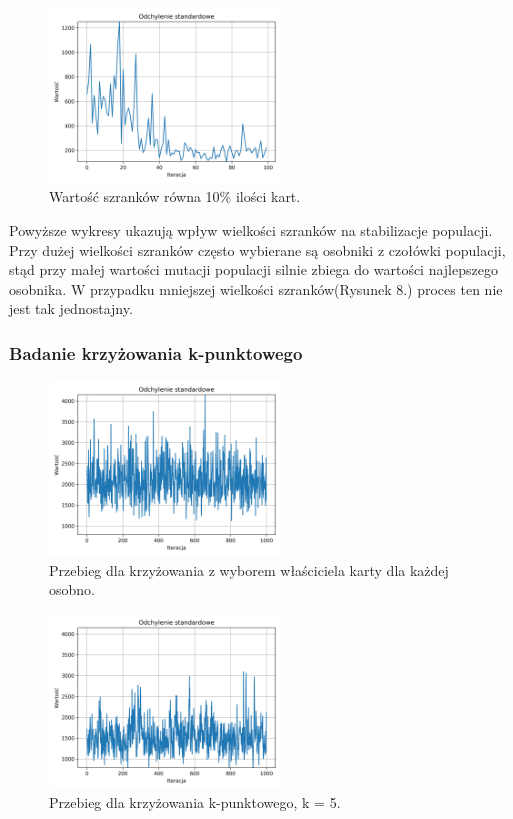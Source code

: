\documentclass[12pt]{article}
\begin{document}
\begin{figure}[ht]
	\centering					\includegraphics[width=0.55\textwidth]{tournament_2.png}
	\caption{Wartość szranków równa 10\% ilości kart.}
	\label{fig1}
\end{figure}

Powyższe wykresy ukazują wpływ wielkości szranków na stabilizacje populacji. Przy dużej wielkości szranków często wybierane są osobniki z czołówki populacji, stąd przy małej wartości mutacji populacji silnie zbiega do wartości najlepszego osobnika. W przypadku mniejszej wielkości szranków(Rysunek 8.) proces ten nie jest tak jednostajny. 

\newpage
\subsubsection{Badanie krzyżowania k-punktowego}
\begin{figure}[ht]
	\centering					\includegraphics[width=0.55\textwidth]{k_1.png}
	\caption{Przebieg dla krzyżowania z wyborem właściciela karty dla każdej osobno.}
	\label{fig1}
\end{figure}


\begin{figure}[ht]
	\centering					\includegraphics[width=0.55\textwidth]{k_2.png}
	\caption{Przebieg dla krzyżowania k-punktowego, k = 5.}
	\label{fig1}
\end{figure}
\end{document}
